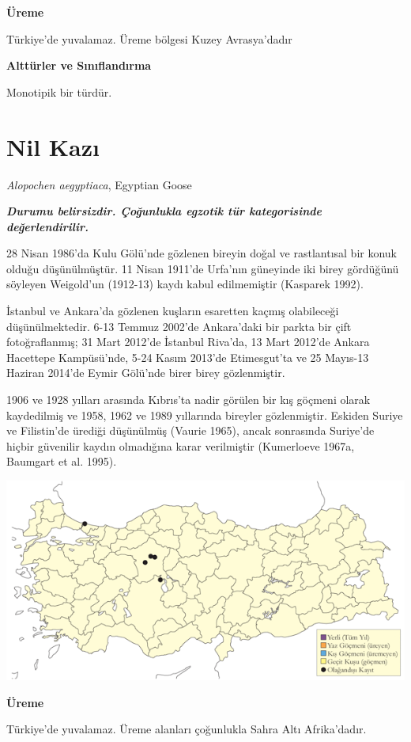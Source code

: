 \documentclass[
  letterpaper,
  DIV=11,
  numbers=noendperiod]{scrreprt}
\begin{document}
\textbf{Üreme}

Türkiye'de yuvalamaz. Üreme bölgesi Kuzey Avrasya'dadır

\textbf{Alttürler ve Sınıflandırma}

Monotipik bir türdür.

\section{Nil Kazı}\label{nil-kazux131}

\emph{Alopochen aegyptiaca}, Egyptian Goose

\textbf{\emph{Durumu belirsizdir. Çoğunlukla egzotik tür kategorisinde
değerlendirilir.}}

28 Nisan 1986'da Kulu Gölü'nde gözlenen bireyin doğal ve rastlantısal
bir konuk olduğu düşünülmüştür. 11 Nisan 1911'de Urfa'nın güneyinde iki
birey gördüğünü söyleyen Weigold'un (1912-13) kaydı kabul edilmemiştir
(Kasparek 1992).

İstanbul ve Ankara'da gözlenen kuşların esaretten kaçmış olabileceği
düşünülmektedir. 6-13 Temmuz 2002'de Ankara'daki bir parkta bir çift
fotoğraflanmış; 31 Mart 2012'de İstanbul Riva'da, 13 Mart 2012'de Ankara
Hacettepe Kampüsü'nde, 5-24 Kasım 2013'de Etimesgut'ta ve 25 Mayıs-13
Haziran 2014'de Eymir Gölü'nde birer birey gözlenmiştir.

1906 ve 1928 yılları arasında Kıbrıs'ta nadir görülen bir kış göçmeni
olarak kaydedilmiş ve 1958, 1962 ve 1989 yıllarında bireyler
gözlenmiştir. Eskiden Suriye ve Filistin'de ürediği düşünülmüş (Vaurie
1965), ancak sonrasında Suriye'de hiçbir güvenilir kaydın olmadığına
karar verilmiştir (Kumerloeve 1967a, Baumgart et al. 1995).

\includegraphics{images/harita_Page_011.png}

\textbf{Üreme}

Türkiye'de yuvalamaz. Üreme alanları çoğunlukla Sahra Altı Afrika'dadır.
\end{document}
